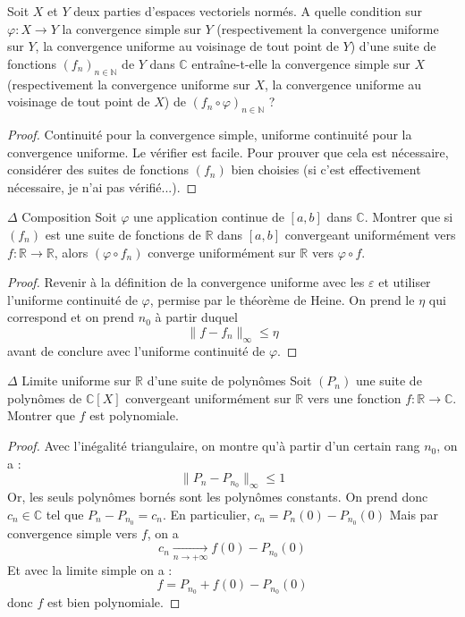 \documentclass[french,a4paper]{article}
\newcommand{\N}{\mathbb{N}}
\newcommand{\R}{\mathbb{R}}
\newcommand{\C}{\mathbb{C}}
\theoremstyle{plain}
\theoremstyle{definition}
\theoremstyle{remark}
\begin{document}
\begin{ex}{}
	Soit $X$ et $Y$ deux parties d'espaces vectoriels normés. A quelle condition sur $\varphi:X\to Y$ la convergence simple sur $Y$ (respectivement la convergence uniforme sur $Y$, la convergence uniforme au voisinage de tout point de $Y$) d'une suite de fonctions $(f_n)_{n\in\N}$ de $Y$ dans $\C$ entraîne-t-elle la convergence simple sur $X$ (respectivement la convergence uniforme sur $X$, la convergence uniforme au voisinage de tout point de $X$) de $(f_n\circ\varphi)_{n\in\N}$ ?
\end{ex}
\begin{proof}
	Continuité pour la convergence simple, uniforme continuité pour la convergence uniforme. Le vérifier est facile. Pour prouver que cela est nécessaire, considérer des suites de fonctions $(f_n)$ bien choisies (si c'est effectivement nécessaire, je n'ai pas vérifié...).
\end{proof}

\begin{ex}{$\Delta$ Composition}
	Soit $\varphi$ une application continue de $[a,b]$ dans $\C$. Montrer que si $(f_n)$ est une suite de fonctions de $\R$ dans $[a,b]$ convergeant uniformément vers $f:\R\to\R$, alors $(\varphi\circ f_n)$ converge uniformément sur $\R$ vers $\varphi\circ f$.
\end{ex}
\begin{proof}
	Revenir à la définition de la convergence uniforme avec les $\varepsilon$ et utiliser l'uniforme continuité de $\varphi$, permise par le théorème de Heine. On prend le $\eta$ qui correspond et on prend $n_0$ à partir duquel $$\lVert f-f_n\rVert_\infty\leqslant\eta$$ avant de conclure avec l'uniforme continuité de $\varphi$.
\end{proof}

\begin{ex}{$\Delta$ Limite uniforme sur $\R$ d'une suite de polynômes}
	Soit $(P_n)$ une suite de polynômes de $\C[X]$ convergeant uniformément sur $\R$ vers une fonction $f:\R\to\C$. Montrer que $f$ est polynomiale.
\end{ex}
\begin{proof}
	Avec l'inégalité triangulaire, on montre qu'à partir d'un certain rang $n_0$, on a : $$\lVert P_n-P_{n_0}\rVert_\infty\leqslant1$$ Or, les seuls polynômes bornés sont les polynômes constants. On prend donc $c_n\in\C$ tel que $P_n-P_{n_0}=c_n$. En particulier, $c_n=P_n(0)-P_{n_0}(0)$ Mais par convergence simple vers $f$, on a $$c_n\xrightarrow[n\to+\infty]{}f(0)-P_{n_0}(0)$$ Et avec la limite simple on a : $$f=P_{n_0}+f(0)-P_{n_0}(0)$$ donc $f$ est bien polynomiale.
\end{proof}
\end{document}
